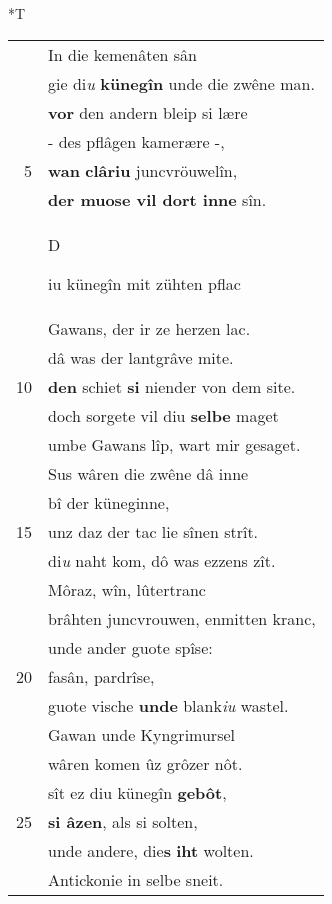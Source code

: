 \documentclass[8pt,a4paper,notitlepage]{article}
\begin{document}
\begin{table}[ht]
\begin{minipage}[t]{0.5\linewidth}
\end{minipage}
\hspace{0.5cm}
\begin{minipage}[t]{0.5\linewidth}
\small
\begin{center}*T
\end{center}
\begin{tabular}{rl}
 & In die kemenâten sân\\ 
 & gie di\textit{u} \textbf{künegîn} unde die zwêne man.\\ 
 & \textbf{vor} den andern bleip si lære\\ 
 & - des pflâgen kamerære -,\\ 
5 & \textbf{wan} \textbf{clâriu} juncvröuwelîn,\\ 
 & \textbf{der muose vil dort inne} sîn.\\ 
 & \begin{large}D\end{large}iu künegîn mit zühten pflac\\ 
 & Gawans, der ir ze herzen lac.\\ 
 & dâ was der lantgrâve mite.\\ 
10 & \textbf{den} schiet \textbf{si} niender von dem site.\\ 
 & doch sorgete vil diu \textbf{selbe} maget\\ 
 & umbe Gawans lîp, wart mir gesaget.\\ 
 & Sus wâren die zwêne dâ inne\\ 
 & bî der küneginne,\\ 
15 & unz daz der tac lie sînen strît.\\ 
 & di\textit{u} naht kom, dô was ezzens zît.\\ 
 & Môraz, wîn, lûtertranc\\ 
 & brâhten juncvrouwen, enmitten kranc,\\ 
 & unde ander guote spîse:\\ 
20 & fasân, pardrîse,\\ 
 & guote vische \textbf{unde} blank\textit{iu} wastel.\\ 
 & Gawan unde Kyngrimursel\\ 
 & wâren komen ûz grôzer nôt.\\ 
 & sît ez diu künegîn \textbf{gebôt},\\ 
25 & \textbf{si âzen}, als si solten,\\ 
 & unde andere, die\textbf{s} \textbf{iht} wolten.\\ 
 & Antickonie in selbe sneit.\\ 

\end{tabular}
\end{minipage}
\end{table}
\end{document}
